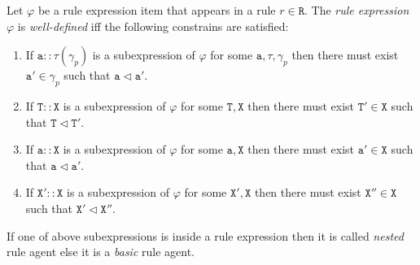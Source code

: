 \documentclass{entcs}
\renewcommand{\~}[0]{\texttildelow}
\begin{document}
\begin{definition}
Let $\varphi$ be a rule expression item that appears in a rule $r\in\mathtt{R}$. The \emph{rule expression} $\varphi$ is \emph{well-defined} iff the following constrains are satisfied:

\begin{enumerate}
 \item If $\mathtt{a}::\tau(\gamma_p)$ is a subexpression of $\varphi$ for some $\mathtt{a},\tau,\gamma_p$ then there must exist $\mathtt{a}' \in \gamma_p$ such that $\mathtt{a} \lhd \mathtt{a}'$.

\item If $\mathtt{T}::\mathtt{X}$ is a subexpression of $\varphi$ for some $\mathtt{T},\mathtt{X}$ then there must exist $\mathtt{T}' \in \mathtt{X}$ such that $\mathtt{T} \lhd \mathtt{T}'$.

\item If $\mathtt{a}::\mathtt{X}$ is a subexpression of $\varphi$ for some $\mathtt{a},\mathtt{X}$ then there must exist $\mathtt{a}' \in \mathtt{X}$ such that $\mathtt{a} \lhd \mathtt{a}'$.

\item If $\mathtt{X}'::\mathtt{X}$ is a subexpression of $\varphi$ for some $\mathtt{X}',\mathtt{X}$ then there must exist $\mathtt{X}'' \in \mathtt{X}$ such that $\mathtt{X}' \lhd \mathtt{X}''$.

\end{enumerate}
 
If one of above subexpressions is inside a rule expression then it is called \emph{nested} rule agent else it is a \emph{basic} rule agent.
\end{definition}
\end{document}
